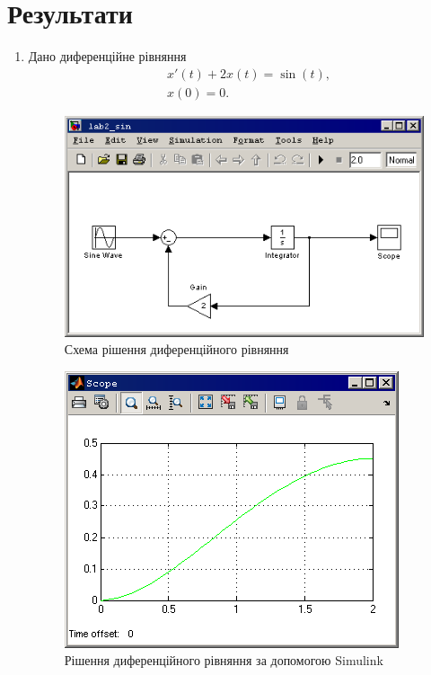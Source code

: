 \documentclass[a4paper, 10pt]{article}
\begin{document}
\section{Результати}
\begin{enumerate}
\item{
	Дано диференційне рівняння
	\begin{align*}
	&x'(t)+2x(t)=\sin(t),\\
	&x(0) = 0.
	\end{align*}

	\begin{figure}[H]
	\begin{center}
	\includegraphics{1_sin_model.png}
	\caption{Схема рішення диференційного рівняння}
	\end{center}
	\end{figure}

	\begin{figure}[H]
	\begin{center}
	\includegraphics{1_sin.png}
	\caption{Рішення диференційного рівняння за допомогою Simulink}
	\end{center}
	\end{figure}

}
\end{enumerate}
\end{document}
